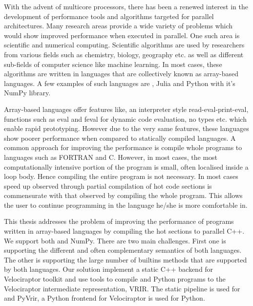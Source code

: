 With the advent of multicore processors, there has been a renewed interest in the development of performance tools and algorithms targeted for parallel architectures. Many research areas  provide a wide variety of problems which would show improved performance when executed in parallel. One such area is scientific and numerical computing. Scientific algorithms are used by researchers from various fields such as chemistry, biology, geography etc. as well as different sub-fields of computer science like machine learning. In most cases, these algorithms are written in languages  that are collectively known as  array-based languages. A few examples of such languages are \matlab\cite{matlab}, Julia\cite{julia} and Python\cite{python} with it's NumPy\cite{numpy} library. 

Array-based languages offer features like, an interpreter style read-eval-print-eval, functions such as eval and feval for dynamic code evaluation, no types etc. which enable rapid prototyping. However due to the very same features, these languages show poorer performance when compared to statically compiled languages. A common approach for improving the performance is compile whole programs to languages such as {\sc FORTRAN}\cite{fortran} and C\cite{clang}. 
However, in most cases, the most computationally intensive portion of the program is small, often localised inside a loop body. Hence compiling the entire program is not necessary. In most cases speed up observed through partial compilation of hot code sections is commensurate with that observed by compiling the whole program. This allows the user to continue programming in the language he/she is more comfortable in.

This thesis addresses the problem of improving the performance of programs written in array-based languages by compiling the hot sections to parallel C++\cite{cpp}. We support both \matlab and NumPy. There are two main challenges. First one is supporting the different and often complementary semantics of both languages. The other is supporting the large number of builtins methods that are supported by both languages.
Our solution implement a static C++ backend for Velociraptor\cite{velociraptor} toolkit and use tools to compile \matlab and Python programs to the Velociraptor intermediate representation, VRIR. The \mclab\cite{casey:mclab} static pipeline is used for \matlab and PyVrir, a Python frontend for Velociraptor is used for Python. 
